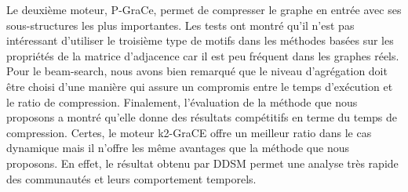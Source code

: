 	Le deuxième moteur, P-GraCe, permet de compresser le graphe en entrée avec ses sous-structures les plus importantes. Les tests ont montré qu'il n'est pas intéressant d'utiliser le troisième type de motifs dans les méthodes basées sur les propriétés de la matrice d'adjacence car il est peu fréquent dans les graphes réels. Pour le beam-search, nous avons bien remarqué que le niveau d'agrégation doit être choisi d'une manière qui assure un compromis entre le temps d'exécution et le ratio de compression. 
	Finalement, l'évaluation de la méthode que nous proposons a montré qu'elle donne des résultats compétitifs en terme du temps de compression. Certes, le moteur k2-GraCE offre un meilleur ratio dans le cas dynamique mais il n'offre les même avantages que la méthode que nous proposons. En effet, le résultat obtenu par DDSM permet une analyse très rapide des communautés et leurs comportement temporels.
	
	
	
	
	
	
	
	
	
	
	
	
	
	
	
	
	
	
	
	
	
	
	
	
	
	
	
	
	
	